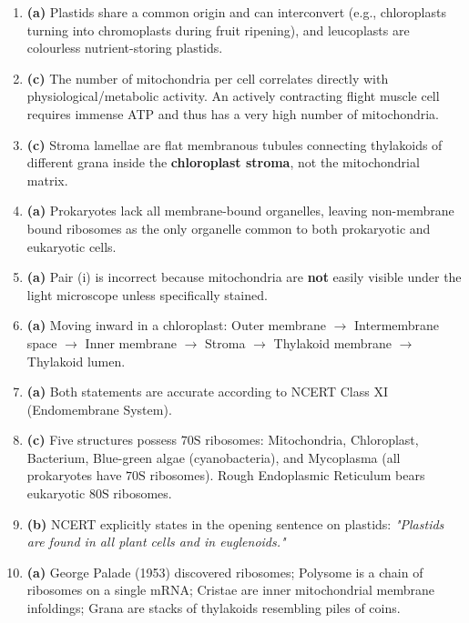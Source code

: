 \documentclass[11pt, a4paper]{article}
\begin{document}
\begin{enumerate}[label=\textbf{\arabic*.}, leftmargin=*, itemsep=6pt]
    \item \textbf{(a)} Plastids share a common origin and can interconvert (e.g., chloroplasts turning into chromoplasts during fruit ripening), and leucoplasts are colourless nutrient-storing plastids.

    \item \textbf{(c)} The number of mitochondria per cell correlates directly with physiological/metabolic activity. An actively contracting flight muscle cell requires immense ATP and thus has a very high number of mitochondria.

    \item \textbf{(c)} Stroma lamellae are flat membranous tubules connecting thylakoids of different grana inside the \textbf{chloroplast stroma}, not the mitochondrial matrix.

    \item \textbf{(a)} Prokaryotes lack all membrane-bound organelles, leaving non-membrane bound ribosomes as the only organelle common to both prokaryotic and eukaryotic cells.

    \item \textbf{(a)} Pair (i) is incorrect because mitochondria are \textbf{not} easily visible under the light microscope unless specifically stained.

    \item \textbf{(a)} Moving inward in a chloroplast: Outer membrane $\rightarrow$ Intermembrane space $\rightarrow$ Inner membrane $\rightarrow$ Stroma $\rightarrow$ Thylakoid membrane $\rightarrow$ Thylakoid lumen.

    \item \textbf{(a)} Both statements are accurate according to NCERT Class XI (Endomembrane System).

    \item \textbf{(c)} Five structures possess $70\text{S}$ ribosomes: Mitochondria, Chloroplast, Bacterium, Blue-green algae (cyanobacteria), and Mycoplasma (all prokaryotes have $70\text{S}$ ribosomes). Rough Endoplasmic Reticulum bears eukaryotic $80\text{S}$ ribosomes.

    \item \textbf{(b)} NCERT explicitly states in the opening sentence on plastids: \textit{"Plastids are found in all plant cells and in euglenoids."}

    \item \textbf{(a)} George Palade (1953) discovered ribosomes; Polysome is a chain of ribosomes on a single mRNA; Cristae are inner mitochondrial membrane infoldings; Grana are stacks of thylakoids resembling piles of coins.

\end{enumerate}
\end{document}
